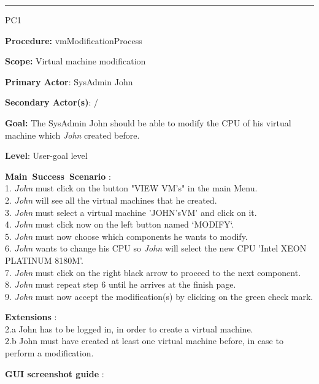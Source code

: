 \hrule
\vspace{0.5cm}
\begin{lyxlist}{PC1}
\small{
\item [\textbf{Procedure:}] vmModificationProcess
\item [\textbf{Scope:}] Virtual machine modification
\item [\textbf{Primary Actor}:] SysAdmin John 
\item [\textbf{Secondary Actor(s)}:] /
\item [\textbf{Goal:}] The SysAdmin John should be able to modify the CPU of
his virtual machine which \emph{John} created before.
\item [\textbf{Level}:] User-goal level
\item [\textbf{Main~Success~Scenario}]:\\
1. \emph{John} must click on the button "VIEW VM's" in the main Menu.\\
2. \emph{John} will see all the virtual machines that he created.\\
3. \emph{John} must select a virtual machine 'JOHN'sVM' and click on it.\\
4. \emph{John} must click now on the left button named `MODIFY`.\\
5. \emph{John} must now choose which components he wants to modify.\\
6. \emph{John} wants to change his CPU so \emph{John} will select the new CPU
'Intel XEON PLATINUM 8180M'.\\
7. \emph{John} must click on the right black arrow to proceed to the next
component. \\
8. \emph{John} must repeat step 6 until he arrives at the finish page.\\
9. \emph{John} must now accept the modification(s) by clicking on the green
check mark.\\


\item [\textbf{Extensions}]:\\
2.a John has to be logged in, in order to create a virtual machine.\\
2.b John must have created at least one virtual machine before, in case to
perform a modification.\\

\item [\textbf{GUI screenshot guide}]:\\
}



\end{lyxlist}
